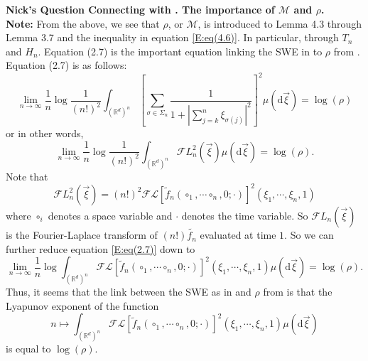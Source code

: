 \documentclass[a4paper,11pt]{article}
\numberwithin{equation}{section}
\theoremstyle{plain}
\theoremstyle{definition}
\newcommand{\ud}{\ensuremath{\mathrm{d} }}
\newcommand{\R}{\mathbb{R}}
\newcounter{NQ}
\newenvironment{NickQuestion}[1][] %
{\refstepcounter{NQ}
	\begin{mdframed}[backgroundcolor=lightgray]\textbf{Nick's Question \theNQ \: #1~~}~~~\noindent}%
	{\end{mdframed}}
\numberwithin{NQ}{section}
\numberwithin{LQ}{section}
\numberwithin{ZQ}{section}
\begin{document}
\begin{NickQuestion}[Connecting \cite{BCC21} with \cite{BCR09}. The importance of $\mathcal{M}$ and $\rho$.]
\textbf{Note:} From the above, we see that $\rho$, or $\mathcal{M}$, is introduced to Lemma 4.3 through Lemma 3.7 and the inequality in equation \eqref{E:eq(4.6)}. In particular, through $T_n$ and $H_n$. Equation (2.7) \cite{BCC21} is the important equation linking the SWE in \cite{BCC21} to $\rho$ from \cite{BCR09}. Equation (2.7) is as follows:
	\begin{equation}\label{E:eq(2.7)}
		\lim_{n \to \infty} \frac{1}{n} \log \frac{1}{(n!)^2} \int_{(\R^d)^n} \left[ \sum_{\sigma \in \Sigma_n} \frac{1}{ 1 + \left| \sum_{j=k}^n \xi_{\sigma(j)} \right|^2 } \right]^2 \mu(\ud \vec{\xi}) = \log(\rho)
	\end{equation}
or in other words,
	\[
		\lim_{n \to \infty} \frac{1}{n} \log \frac{1}{(n!)^2} \int_{(\R^d)^n} \mathcal{F}L_n^2(\vec{\xi}) \mu(\ud \vec{\xi}) = \log(\rho).
	\]
Note that
	\[
		\mathcal{F}L_n^2(\vec{\xi})  = (n!)^2 \mathcal{F}\mathcal{L}\left[\tilde{f}_n(\circ_1,\cdots\circ_n,0;\cdot)\right]^2(\xi_1,\cdots,\xi_n,1)
	\]
where $\circ_i$ denotes a space variable and $\cdot$ denotes the time variable. So $\mathcal{F}L_n(\vec{\xi}) $ is the Fourier-Laplace transform of $(n!)\tilde{f_n}$ evaluated at time $1$. So we can further reduce equation \eqref{E:eq(2.7)} down to
	\begin{equation}\label{E:FL}
		\lim_{n \to \infty} \frac{1}{n} \log  \int_{(\R^d)^n} \mathcal{F}\mathcal{L}\left[\tilde{f}_n(\circ_1,\cdots\circ_n,0;\cdot)\right]^2(\xi_1,\cdots,\xi_n,1) \mu(\ud \vec{\xi}) = \log(\rho).
	\end{equation}
Thus, it seems that the link between the SWE as in \cite{BCC21} and $\rho$ from \cite{BCR09} is that the Lyapunov exponent of the function
	\begin{equation}\label{E:FLfunction}
		n \mapsto \int_{(\R^d)^n} \mathcal{F}\mathcal{L}\left[\tilde{f}_n(\circ_1,\cdots\circ_n,0;\cdot)\right]^2(\xi_1,\cdots,\xi_n,1) \mu(\ud \vec{\xi})
	\end{equation}
is equal to $\log(\rho)$.


\end{NickQuestion}
\end{document}
